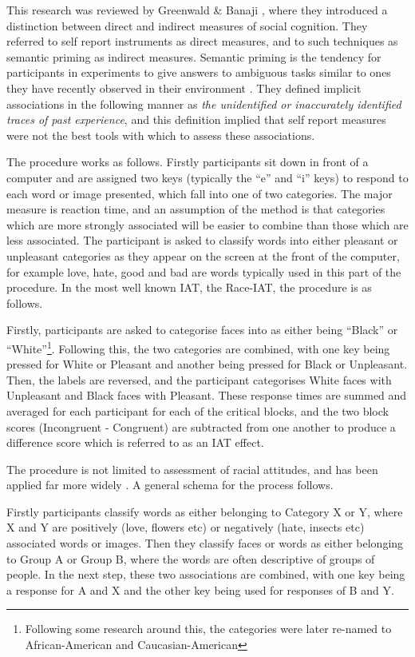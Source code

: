 This research was reviewed by Greenwald \& Banaji \cite{Greenwald1995a}, where they introduced a distinction between direct and indirect measures of social cognition. They referred to self report instruments as direct measures, and to such techniques as semantic priming as indirect measures. Semantic priming is the tendency for participants in experiments to give answers to ambiguous tasks similar to ones they have recently observed in their environment \cite{Wittenbrink2007}.  They defined implicit associations in the following manner as \textit{the unidentified or inaccurately identified traces of past experience}, and this definition implied that self report measures were not the best tools with which to assess these associations. 

The procedure works as follows. Firstly participants sit down in front of a computer and are assigned two keys (typically the ``e'' and ``i'' keys) to respond to each word or image presented, which fall into one of two categories. The major measure is reaction time, and an assumption of the method is that categories which are more strongly associated will be easier to combine than those which are less associated.  The participant is asked to classify words into either pleasant or unpleasant categories as they appear on the screen at the front of the computer, for example love, hate, good  and bad are words typically used in this part of the procedure. In the most well known IAT, the Race-IAT, the procedure is as follows. 

Firstly, participants are asked to categorise faces into as either being ``Black'' or ``White''\footnote{Following some research around this, the categories were later re-named to African-American and Caucasian-American}. Following this, the two categories are combined, with one key being pressed for White or Pleasant and another being pressed for Black or Unpleasant. Then, the labels are reversed, and the participant categorises White faces with Unpleasant and Black faces with Pleasant. These response times are summed and averaged for each participant for each of the critical blocks, and the two block scores (Incongruent - Congruent) are subtracted from one another to produce a difference score which is referred to as an IAT effect. 

The procedure is not limited to assessment of racial attitudes, and has been applied far more widely \cite{Craeynest2008,Greenwald2009, Schmukle2008,Walker2008}.  A general schema for the process follows.   

Firstly participants classify words as either belonging to Category X or Y, where X and Y are positively (love, flowers etc) or negatively (hate, insects etc) associated words or images.  Then they classify faces or words
as either belonging to Group A or Group B, where the words are often descriptive of groups of people.  In the next step, these two associations are combined, with one key being a response for A and X and the other key being used for responses of B and Y. 

